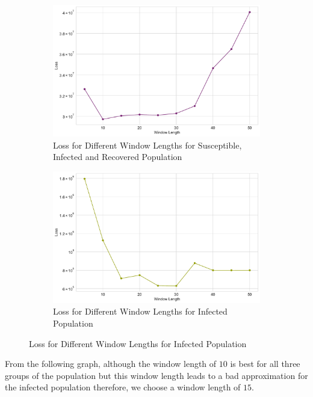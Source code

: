 \documentclass[tikz,fleqn,12pt]{wlscirep}
\begin{document}
\begin{figure}[htbp!]
  \caption{Loss for Different Window Lengths}
  \begin{subfigure}[t]{0.48\textwidth}
    \centering
    \includegraphics[width=\linewidth]{images/window_length_loss_SIR_IND.pdf}
    \caption{Loss for Different Window Lengths for Susceptible, Infected and Recovered Population}
    \label{fig:window_length_loss_SIR_IND}
  \end{subfigure}
  \hfill
  \begin{subfigure}[t]{0.48\textwidth}
    \centering
    \includegraphics[width=\linewidth]{images/window_length_loss_I_IND.pdf}
    \caption{Loss for Different Window Lengths for Infected Population}
    \label{fig:window_length_loss_I_IND}
  \end{subfigure}
\end{figure}

From the following graph, although the window length of $10$ is best for all three groups of the population but this window length leads to a bad approximation for the infected population therefore, we choose a window length of $15$.
\end{document}
